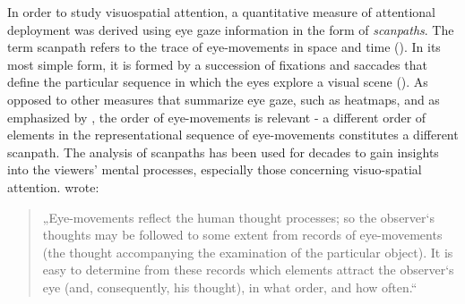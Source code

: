 \documentclass[a4paper, 12pt]{scrreprt}
\begin{document}
In order to study visuospatial attention, a quantitative measure of attentional deployment was derived using eye gaze information in the form of \textit{scanpaths}.
The term scanpath refers to the trace of eye-movements in space and time (\cite{holmqvist2011eye}). In its most simple form, it is formed by a succession of fixations and saccades that define the particular sequence in which the eyes explore a visual scene (\cite{anderson2015comparison}). As opposed to other measures that summarize eye gaze, such as heatmaps, and as  emphasized by \textcite{holmqvist2011eye}, the order of eye-movements is relevant - a different order of elements in the representational sequence of eye-movements constitutes a different scanpath. \newline
The analysis of scanpaths has been used for decades to gain insights into the viewers’ mental processes, especially those concerning visuo-spatial attention. \textcite{yarbus1967eye} wrote: 

\begin{quotation}
\footnotesize{„Eye-movements reflect the human thought processes; so the observer‘s thoughts may be followed to some extent from records of eye-movements (the thought accompanying the examination of the particular object). It is easy to determine from these records which elements attract the observer‘s eye (and, consequently, his thought), in what order, and how often.“}
\end{quotation}
\end{document}
